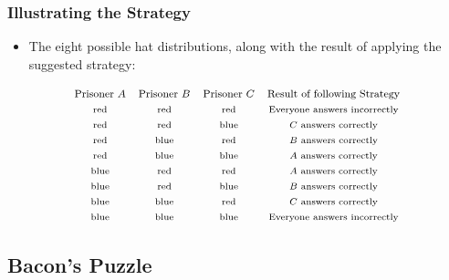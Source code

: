 \begin{frame}
\frametitle{Illustrating the Strategy}

\begin{itemize}[<+->]
\item The eight possible hat distributions, along with the result of applying the suggested strategy: 
\end{itemize}

\[
\begin{array}{cccc}
\text{\footnotesize Prisoner $A$} & \text{\footnotesize Prisoner $B$} & \text{\footnotesize Prisoner $C$} &\text{\footnotesize Result of following Strategy} \\
 \text{\scriptsize red} & \text{\scriptsize red} & \text{\scriptsize red} & \text{\scriptsize Everyone answers incorrectly} \\
  \text{\scriptsize red} & \text{\scriptsize red} & \text{\scriptsize blue} & \text{\scriptsize $C$ answers correctly} \\
   \text{\scriptsize red} & \text{\scriptsize blue} & \text{\scriptsize red} & \text{\scriptsize $B$ answers correctly} \\
    \text{\scriptsize red} & \text{\scriptsize blue} & \text{\scriptsize blue} & \text{\scriptsize $A$ answers correctly} \\
     \text{\scriptsize blue} & \text{\scriptsize red} & \text{\scriptsize red} & \text{\scriptsize $A$ answers correctly} \\
      \text{\scriptsize blue} & \text{\scriptsize red} & \text{\scriptsize blue} & \text{\scriptsize $B$ answers correctly} \\
       \text{\scriptsize blue} & \text{\scriptsize blue} & \text{\scriptsize red} & \text{\scriptsize $C$ answers correctly} \\
        \text{\scriptsize blue} & \text{\scriptsize blue} & \text{\scriptsize blue} & \text{\scriptsize Everyone answers incorrectly} \\
\end{array}
\]
\end{frame}

\subsection{Bacon's Puzzle}

